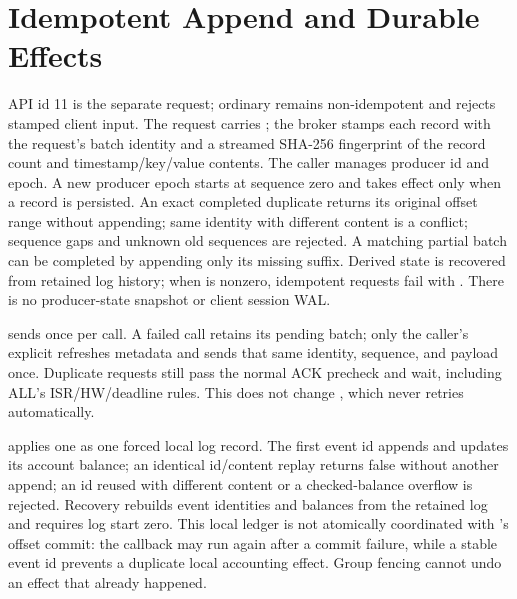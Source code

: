 \section{Idempotent Append and Durable Effects}
API id 11 is the separate  request; ordinary  remains non-idempotent and rejects stamped client input. The request carries ; the broker stamps each record with the request's batch identity and a streamed SHA-256 fingerprint of the record count and timestamp/key/value contents. The caller manages producer id and epoch. A new producer epoch starts at sequence zero and takes effect only when a record is persisted. An exact completed duplicate returns its original offset range without appending; same identity with different content is a conflict; sequence gaps and unknown old sequences are rejected. A matching partial batch can be completed by appending only its missing suffix. Derived state is recovered from retained log history; when  is nonzero, idempotent requests fail with . There is no producer-state snapshot or client session WAL.

 sends once per call. A failed call retains its pending batch; only the caller's explicit  refreshes metadata and sends that same identity, sequence, and payload once. Duplicate requests still pass the normal ACK precheck and wait, including ALL's ISR/HW/deadline rules. This does not change , which never retries automatically.

 applies one  as one forced local log record. The first event id appends and updates its account balance; an identical id/content replay returns false without another append; an id reused with different content or a checked-balance overflow is rejected. Recovery rebuilds event identities and balances from the retained log and requires log start zero. This local ledger is not atomically coordinated with 's offset commit: the callback may run again after a commit failure, while a stable event id prevents a duplicate local accounting effect. Group fencing cannot undo an effect that already happened.
